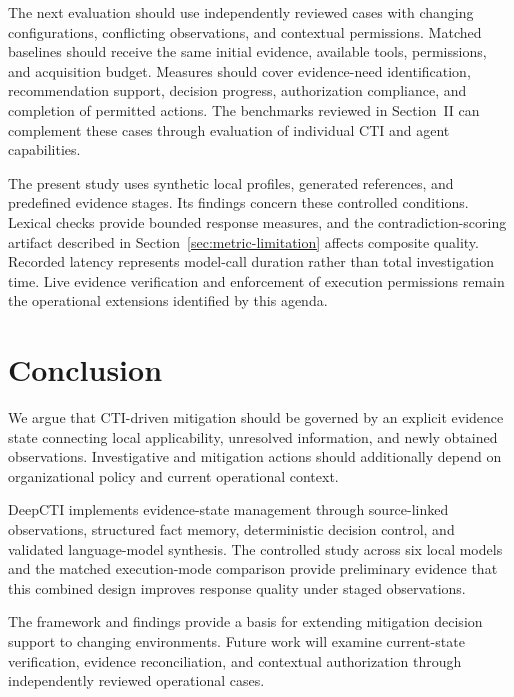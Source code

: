 \documentclass[conference]{IEEEtran}
\begin{document}
The next evaluation should use independently reviewed cases with
changing configurations, conflicting observations, and contextual
permissions. Matched baselines should receive the same initial evidence,
available tools, permissions, and acquisition budget. Measures should
cover evidence-need identification, recommendation support, decision
progress, authorization compliance, and completion of permitted actions.
The benchmarks reviewed in Section~II can complement these cases
through evaluation of individual CTI and agent capabilities.

The present study uses synthetic local profiles, generated references,
and predefined evidence stages. Its findings concern these controlled
conditions. Lexical checks provide bounded response measures, and the
contradiction-scoring artifact described in
Section~\ref{sec:metric-limitation} affects composite quality. Recorded
latency represents model-call duration rather than total investigation
time. Live evidence verification and enforcement of execution permissions
remain the operational extensions identified by this agenda.

\section{Conclusion}

We argue that CTI-driven mitigation should be governed by an explicit
evidence state connecting local applicability, unresolved information,
and newly obtained observations. Investigative and mitigation actions
should additionally depend on organizational policy and current
operational context.

DeepCTI implements evidence-state management through source-linked
observations, structured fact memory, deterministic decision control,
and validated language-model synthesis. The controlled study across
six local models and the matched execution-mode comparison provide
preliminary evidence that this combined design improves response
quality under staged observations.

The framework and findings provide a basis for extending mitigation
decision support to changing environments. Future work will examine
current-state verification, evidence reconciliation, and contextual
authorization through independently reviewed operational cases.




\end{document}

